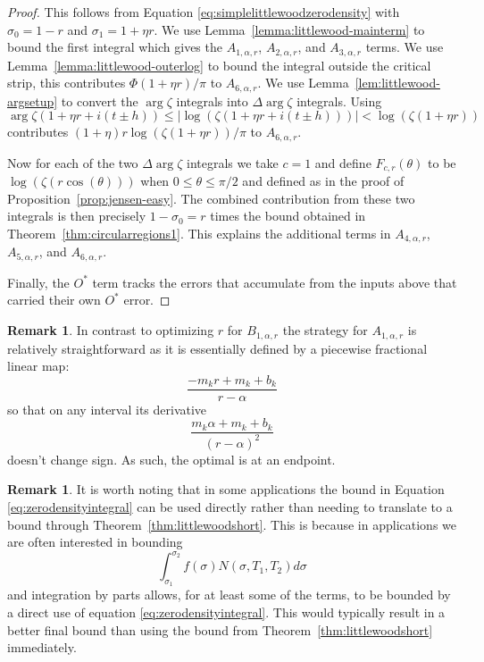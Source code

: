 \documentclass[10pt,english,letter, reqno]{amsart}
\newcommand{\Ostar}{O^{\ast}}
\theoremstyle{plain}
\theoremstyle{definition}
\newtheorem{remark}[theorem]{Remark}
\begin{document}
\begin{proof}
This follows from Equation \eqref{eq:simplelittlewoodzerodensity} with $\sigma_0=1-r$ and $\sigma_1=1+\eta r$.
We use Lemma~\ref{lemma:littlewood-mainterm} to bound the first integral which gives the $A_{1,\alpha,r}$, $A_{2,\alpha,r}$, and $A_{3,\alpha,r}$ terms.
We use Lemma~\ref{lemma:littlewood-outerlog} to bound the integral outside the critical strip, this contributes $\Phi(1+\eta r)/\pi$ to $A_{6,\alpha,r} $.
We use Lemma~\ref{lem:littlewood-argsetup} to convert the $\arg\zeta$ integrals into $\Delta\arg\zeta$ integrals.
Using 
\[ \arg\zeta(1+\eta r + i(t \pm h)) \leq |\log(\zeta(1+\eta r + i(t \pm h)))| < \log(\zeta(1+\eta r)) \]
 contributes $(1+\eta)r\log(\zeta(1+\eta r))/\pi$ to $A_{6,\alpha,r}$.

Now for each of the two $\Delta\arg\zeta$ integrals we take $c=1$ and define $F_{c,r}(\theta)$ to be  $ \log(\zeta(r\cos(\theta))) $ when $ 0 \leq \theta \leq \pi/2$ and defined as in the proof of Proposition~\ref{prop:jensen-easy}.
The combined contribution from these two integrals is then precisely $1-\sigma_0=r$ times the bound obtained in Theorem~\ref{thm:circularregions1}. This explains the additional terms in $A_{4,\alpha,r}$, $A_{5,\alpha,r}$, and $A_{6,\alpha,r}$. 

Finally, the $\Ostar$ term tracks the errors that accumulate from the inputs above that carried their own $\Ostar$ error.
\end{proof}

\begin{remark}
    In contrast to optimizing $r$ for $B_{1,\alpha,r}$ the strategy for $A_{1,\alpha,r}$ is relatively straightforward as it is essentially defined by a piecewise fractional linear map:
    \[   \frac{-m_k r + m_k+b_k}{r-\alpha} \]
    so that on any interval its derivative  
    \[   \frac{  m_k\alpha + m_k+b_k}{(r-\alpha)^2}\]
    doesn't change sign. As such, the optimal is at an endpoint.
\end{remark}

\begin{remark}\label{rem:useintegralbound}
    It is worth noting that in some applications the bound in Equation \eqref{eq:zerodensityintegral} can be used directly rather than needing to translate to a bound through Theorem~\ref{thm:littlewoodshort}. This is because in applications we are often interested in bounding
    \[ \int_{\sigma_1}^{\sigma_2} f(\sigma)N(\sigma,T_1,T_2)d\sigma \]
    and integration by parts allows, for at least some of the terms, to be bounded by a direct use of equation \eqref{eq:zerodensityintegral}. This would typically result in a better final bound than using the bound from Theorem~\ref{thm:littlewoodshort} immediately.
\end{remark}
\end{document}
